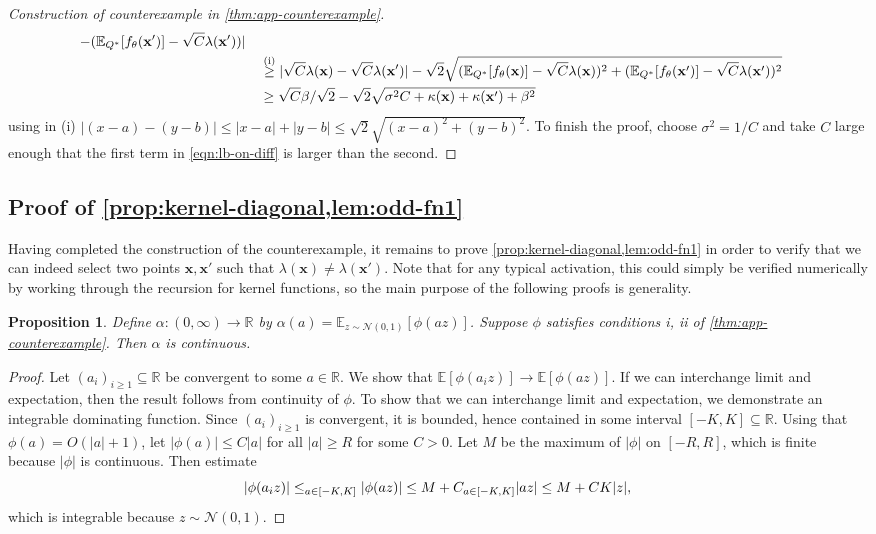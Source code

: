 \documentclass[twoside]{article}
\newcommand{\vx}{\mathbf{x}}
\newcommand{\E}{\mathbb{E}}
\newcommand{\Q}{\mathbb{Q}}
\renewcommand{\Q}{\ensuremath{Q}}
\newcommand{\R}{\mathbb{R}}
\newcommand{\opspace}{}
\let\sup\relax\DeclareMathOperator*{\sup}{sup\opspace}
\newcommand{\Normal}{\mathcal{N}}
\theoremstyle{theoremstyle}
\newtheorem{proposition}[theorem]{Proposition}
\begin{document}
\begin{proof}[Construction of counterexample in \cref{thm:app-counterexample}]
\begin{align}
                - (\E_{\Q^*}[f_{\theta}(\vx')] - \sqrt{C}\lambda(\vx'))
            | \\
    &\quad\overset{\smash{\text{(i)}}}{\ge}
        |\sqrt{C}\lambda(\vx)  - \sqrt{C}\lambda(\vx')|
        -
            \sqrt{2}
            \sqrt{
                (\E_{\Q^*}[f_{\theta}(\vx)] - \sqrt{C}\lambda(\vx))^2
                + (\E_{\Q^*}[f_{\theta}(\vx')]- \sqrt{C}\lambda(\vx'))^2
            } \\
    &\quad\ge
        \sqrt{C}\beta/\sqrt{2}
        -
            \sqrt{2}
            \sqrt{\sigma^2C + \kappa(\vx) + \kappa(\vx') + \beta^2} \label{eqn:lb-on-diff}
\end{align}
using in (i) $|(x - a) - (y - b)| \le |x - a| + |y - b| \le \sqrt{2}\sqrt{(x - a)^2 + (y - b)^2}$.
To finish the proof, choose $\sigma^2 = 1/C$ and take $C$ large enough that the first term in \cref{eqn:lb-on-diff} is larger than the second.
\end{proof}



\subsection{Proof of \cref{prop:kernel-diagonal,lem:odd-fn1}}

Having completed the construction of the counterexample, it remains to prove \cref{prop:kernel-diagonal,lem:odd-fn1} in order to verify that we can indeed select two points $\vx, \vx'$ such that $\lambda(\vx) \neq \lambda(\vx')$. Note that for any typical activation, this could simply be verified numerically by working through the recursion for kernel functions, so the main purpose of the following proofs is generality.

\begin{proposition}\label{prop:e-is-continuous}
    Define $\alpha\colon (0,\infty) \to \R$ by $\alpha(a) = \E_{z\sim \Normal(0,1)}[\phi(az)]$. Suppose $\phi$ satisfies conditions i, ii of \cref{thm:app-counterexample}. Then $\alpha$ is continuous.
\end{proposition}
\begin{proof}
    Let $(a_i)_{i \ge 1} \subseteq \R$ be convergent to some $a \in \R$.
    We show that $\E[\phi(a_i z)] \to \E[\phi(a z)]$.
    If we can interchange limit and expectation, then the result follows from continuity of $\phi$.
    To show that we can interchange limit and expectation, we demonstrate an integrable dominating function.
    Since $(a_i)_{i \ge 1}$ is convergent, it is bounded, hence contained in some interval $[-K, K] \subseteq \R$.
    Using that $\phi(a) = O(|a|+1)$, let $|\phi(a)| \le C |a|$ for all $|a| \ge R$ for some $C > 0$.
    Let $M$ be the maximum of $|\phi|$ on $[-R, R]$, which is finite because $|\phi|$ is continuous.
    Then estimate
    \begin{equation}
        |\phi(a_i z)|
        \le \sup_{a \in [-K, K]} |\phi(a z)|
        \le M + C \sup_{a \in [-K, K]} |a z|
        \le M + C K |z|,
    \end{equation}
    which is integrable because $z \sim \Normal(0,1)$.
\end{proof}
\end{document}
